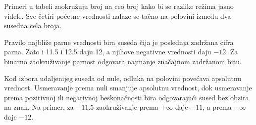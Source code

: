 Primeri u tabeli zaokružuju broj na ceo broj kako bi se razlike režima jasno videle. Sve četiri početne vrednosti nalaze se tačno na polovini između dva susedna cela broja.

Pravilo najbliže parne vrednosti bira suseda čija je poslednja zadržana cifra parna. Zato i 11.5 i 12.5 daju 12, a njihove negativne vrednosti daju $-12$. Za binarno zaokruživanje parnost odgovara najmanje značajnom zadržanom bitu.

Kod izbora udaljenijeg suseda od nule, odluka na polovini povećava apsolutnu vrednost. Usmeravanje prema nuli smanjuje apsolutnu vrednost, dok usmeravanje prema pozitivnoj ili negativnoj beskonačnosti bira odgovarajući sused bez obzira na znak. Na primer, za $-11.5$ zaokruživanje prema $+\infty$ daje $-11$, a prema $-\infty$ daje $-12$.
